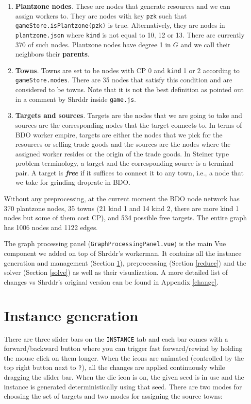 \documentclass[11pt]{article}
\theoremstyle{definition}
\theoremstyle{remark}
\begin{document}
\begin{enumerate}
    \item[$\bullet$] \textbf{Plantzone nodes}. These are nodes that generate resources and we can assign workers to. They are nodes with key \texttt{pzk} such that \texttt{gameStore.isPlantzone(pzk)} is true. Alternatively, they are nodes in \texttt{plantzone.json} where \texttt{kind} is not equal to 10, 12 or 13. There are currently 370 of such nodes. Plantzone nodes have degree 1 in $G$ and we call their neighbors their \textbf{parents}.

    \item[$\bullet$] \textbf{Towns}. Towns are set to be nodes with CP 0 and \texttt{kind} 1 or 2 according to \texttt{gameStore.nodes}. There are 35 nodes that satisfy this condition and are considered to be towns. Note that it is not the best definition as pointed out in a comment by Shrddr inside \texttt{game.js}.

    \item[$\bullet$] \textbf{Targets and sources}. Targets are the nodes that we are going to take and sources are the corresponding nodes that the target connects to. In terms of BDO worker empire, targets are either the nodes that we pick for the resources or selling trade goods and the sources are the nodes where the assigned worker resides or the origin of the trade goods. In Steiner type problem terminology, a target and the corresponding source is a terminal pair. A target is \textbf{\emph{free}} if it suffices to connect it to any town, i.e., a node that we take for grinding droprate in BDO.
\end{enumerate}

Without any preprocessing, at the current moment the BDO node network has 370 plantzone nodes, 35 towns (21 kind 1 and 14 kind 2, there are more kind 1 nodes but some of them cost CP), and 534 possible free targets. The entire graph has 1006 nodes and 1122 edges.

The graph processing panel (\texttt{GraphProcessingPanel.vue}) is the main Vue component we added on top of Shrddr's workerman. It contains all the instance generation and management (Section \ref{instance}), preprocessing (Section \ref{reduce}) and the solver (Section \ref{solve}) as well as their visualization. A more detailed list of changes vs Shrddr's original version can be found in Appendix \ref{change}.


\section{Instance generation}
\label{instance}
There are three slider bars on the \texttt{INSTANCE} tab and each bar comes with a forward/backward button where you can trigger fast forward/rewind by holding the mouse click on them longer. When the icons are animated (controlled by the top right button next to \texttt{?}), all the changes are applied continuously while dragging the slider bar. When the die icon is on, the given seed is in use and the instance is generated deterministically using that seed. There are two modes for choosing the set of targets and two modes for assigning the source towns:
\end{document}

